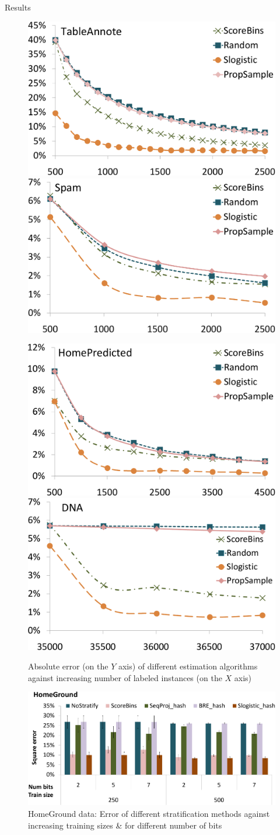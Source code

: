 \documentclass[11pt]{beamer}
\begin{document}
\begin{frame}[allowframebreaks]{Results}
\begin{center}
\framebreak

\begin{figure}
\includegraphics[width=0.37\hsize]{figs/e1tableannote_crop}
\includegraphics[width=0.37\hsize]{figs/e1spam_crop}
\end{figure}
\begin{figure}
\includegraphics[width=0.37\hsize]{figs/e1homepredicted_crop}
\includegraphics[width=0.37\hsize]{figs/e1dna_crop}
\caption{Absolute error (on the $Y$ axis) of different estimation algorithms against increasing number of labeled instances (on the $X$ axis)}
\end{figure}
\end{center}

\framebreak

\begin{center}
\begin{figure}
\includegraphics[width=\hsize]{figs/e2homeground_crop}
\caption{HomeGround data: Error of different stratification methods against increasing
  training sizes \& for different number of bits}
\end{figure}


\end{center}
\end{frame}
\end{document}
